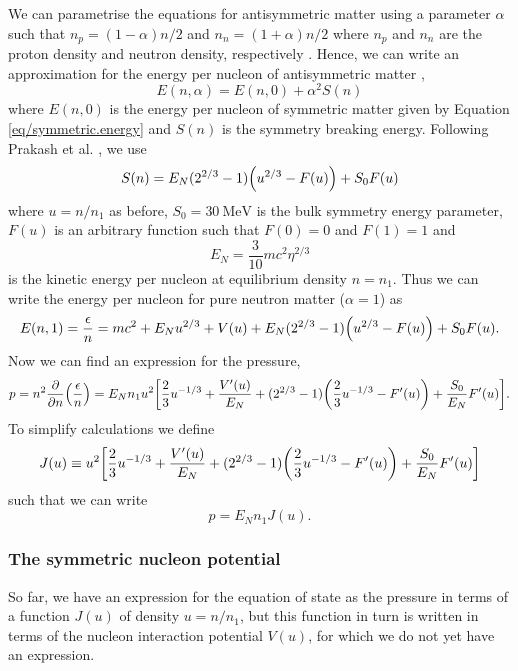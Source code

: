 \documentclass[draft,11pt]{article}
\theoremstyle{definition}
\theoremstyle{remark}
\begin{document}
            We can parametrise the equations for antisymmetric matter using a parameter $\alpha$ such that $n_{p}=(1-\alpha)n/2$ and $n_{n}=(1+\alpha)n/2$ where $n_{p}$ and $n_{n}$ are the proton density and neutron density, respectively \parencite{silbar.reddy.2004/neutron.stars}. Hence, we can write an approximation for the energy per nucleon of antisymmetric matter \parencite{prakash.ainsworth.lattimer.1988/eos}, \begin{equation}\label{eq/antisymmetric.energy}E(n,\alpha)=E(n,0)+\alpha^{2}S(n)\end{equation} where $E(n,0)$ is the energy per nucleon of symmetric matter given by Equation \ref{eq/symmetric.energy} and $S(n)$ is the symmetry breaking energy. Following Prakash et al. \cite{prakash.ainsworth.lattimer.1988/eos}, we use \begin{equation}\label{eq/symmetry.breaking}S(n)=E_{N}(2^{2/3}-1)\qty(u^{2/3}-F(u))+S_{0}F(u)\end{equation} where $u=n/n_{1}$ as before, $S_{0}=\SI{30}{\mega\electronvolt}$ \parencite{prakash.lattimer.2001/ns.structure.eos} is the bulk symmetry energy parameter, $F(u)$ is an arbitrary function such that $F(0)=0$ and $F(1)=1$ and \[E_{N}=\frac{3}{10}mc^{2}\eta^{2/3}\] is the kinetic energy per nucleon at equilibrium density $n=n_{1}$. Thus we can write the energy per nucleon for pure neutron matter ($\alpha=1$) as \[E(n,1)=\frac{\epsilon}{n}=mc^{2}+E_{N}u^{2/3}+V(u)+E_{N}(2^{2/3}-1)\qty(u^{2/3}-F(u))+S_{0}F(u).\] Now we can find an expression for the pressure, \[p=n^{2}\pdv{n}\qty(\frac{\epsilon}{n})=E_{N}n_{1}u^{2}\qty[\frac{2}{3}u^{-1/3}+\frac{V'(u)}{E_{N}}+(2^{2/3}-1)\qty(\frac{2}{3}u^{-1/3}-F'(u))+\frac{S_{0}}{E_{N}}F'(u)].\] To simplify calculations we define \[J(u)\equiv u^{2}\qty[\frac{2}{3}u^{-1/3}+\frac{V'(u)}{E_{N}}+(2^{2/3}-1)\qty(\frac{2}{3}u^{-1/3}-F'(u))+\frac{S_{0}}{E_{N}}F'(u)]\] such that we can write \[p=E_{N}n_{1}J(u).\]
            
            \subsubsection{The symmetric nucleon potential}\label{sec/symmetric.potential}
                So far, we have an expression for the equation of state as the pressure in terms of a function $J(u)$ of density $u=n/n_{1}$, but this function in turn is written in terms of the nucleon interaction potential $V(u)$, for which we do not yet have an expression.
                
\end{document}
